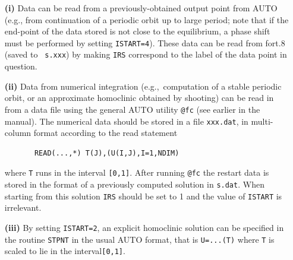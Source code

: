 \documentclass[12pt]{report}
\begin{document}
\begin{itemize}

\item[{\bf(i)}]
Data can be read from a previously-obtained output point from {\cal AUTO}
 (e.g., from continuation of a periodic orbit up to large period;
note that if the end-point of the data stored is not close to the
equilibrium, a phase shift must be performed by setting
{\tt ISTART=4}). These data can be read from fort.8 (saved to {\tt
s.xxx}) by making {\tt IRS} correspond to the label of the data
point in question.

\item[{\bf(ii)}]
Data from numerical integration (e.g.,\ computation of a stable
periodic orbit, or an approximate homoclinic obtained by shooting)  
can be read in from a data file using the general {\cal AUTO} 
utility {\tt @fc} (see earlier in the manual). 
The  numerical data should be stored in
a file  {\tt xxx.dat}, in multi-column format according to the read statement
\begin{verbatim}
       READ(...,*) T(J),(U(I,J),I=1,NDIM)
\end{verbatim}
where {\tt T} runs in the interval {\tt [0,1]}.
After running {\tt @fc} the restart data is stored in
the format of a previously computed solution in {\tt s.dat}.
When starting from this solution {\tt IRS} should be set to 1 and 
the value of {\tt ISTART} is irrelevant.

\item[{\bf(iii)}]
By setting {\tt ISTART=2},  
an explicit homoclinic solution can be specified in the routine {\tt STPNT} 
in the usual {\cal AUTO} format, that is 
{\tt U=...(T)} where {\tt T} is scaled to lie in the
interval{\tt [0,1]}. 


\end{itemize}
\end{document}
